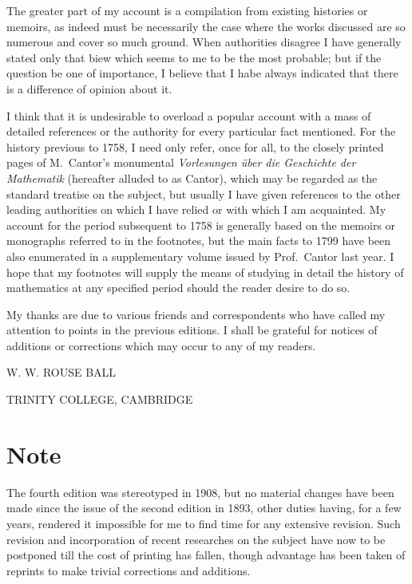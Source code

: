 \documentclass[12pt,oneside]{book}
\begin{document}
The greater part of my account is a compilation from existing histories or memoirs, as indeed must be necessarily the case where the works discussed are
so numerous and cover so much ground. When authorities disagree I have generally stated only that biew which seems to me to be the most probable; but if
the question be one of importance, I believe that I habe always indicated that there is a difference of opinion about it. \par 

I think that it is undesirable to overload a popular account with a mass of detailed references or the authority for every particular fact mentioned.
For the history previous to 1758, I need only refer, once for all, to the closely printed pages of M.~Cantor's monumental \textit{Vorlesungen \"uber die Geschichte der Mathematik}
(hereafter alluded to as Cantor), which may be regarded as the standard treatise on the subject, but usually I have given references to the other leading 
authorities on which I have relied or with which I am acquainted. My account for the period subsequent to 1758 is generally based on the memoirs or monographs referred to
in the footnotes, but the main facts to 1799 have been also enumerated in a supplementary volume issued by Prof.~Cantor last year. I hope that my footnotes will supply 
the means of studying in detail the history of mathematics at any specified period should the reader desire to do so. \par 

My thanks are due to various friends and correspondents who have called my attention to points in the previous editions. I shall be grateful for notices
of additions or corrections which may occur to any of my readers. \par

\begin{flushright}
    {\Large W. W. ROUSE BALL}
\end{flushright}
{\footnotesize TRINITY COLLEGE, CAMBRIDGE}

\chapter{Note}
The fourth edition was stereotyped in 1908, but no material changes have been made since the issue of the second edition in 1893, other duties having,
for a few years, rendered it impossible for me to find time for any extensive revision. Such revision and incorporation of recent researches 
on the subject have now to be postponed till the cost of printing has fallen, though advantage has been taken of reprints to make trivial corrections
and additions. \par 
\end{document}
